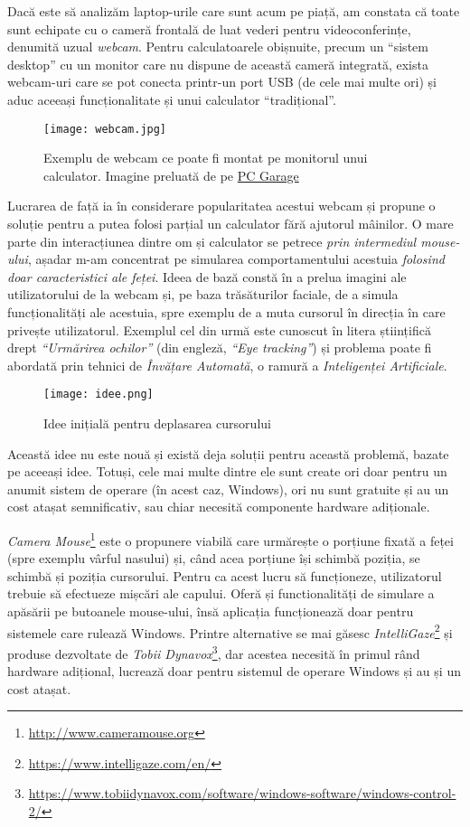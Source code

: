 Dacă este să analizăm laptop-urile care sunt acum pe piață, am constata că toate sunt echipate cu o cameră frontală de luat vederi pentru videoconferințe, denumită uzual \emph{webcam}.
Pentru calculatoarele obișnuite, precum un ``sistem desktop'' cu un monitor care nu dispune de această cameră integrată, exista webcam-uri care se pot conecta printr-un port USB (de cele mai multe ori) și aduc aceeași funcționalitate și unui calculator ``tradițional''.

\begin{figure}[h]
    \centering
    \texttt{[image: webcam.jpg]}
    \caption{Exemplu de webcam ce poate fi montat pe monitorul unui calculator. Imagine preluată de pe \href{https://www.pcgarage.ro/camere-web/logitech/streamcam-off-white/}{PC Garage}}
\end{figure}

Lucrarea de față ia în considerare popularitatea acestui webcam și propune o soluție pentru a putea folosi parțial un calculator fără ajutorul mâinilor.
O mare parte din interacțiunea dintre om și calculator se petrece \emph{prin intermediul mouse-ului}, așadar m-am concentrat pe simularea comportamentului acestuia \emph{folosind doar caracteristici ale feței}.
Ideea de bază constă în a prelua imagini ale utilizatorului de la webcam și, pe baza trăsăturilor faciale, de a simula funcționalități ale acestuia, spre exemplu de a muta cursorul în direcția în care privește utilizatorul.
Exemplul cel din urmă este cunoscut în litera științifică drept \emph{``Urmărirea ochilor''} (din engleză, \emph{``Eye tracking''}) și problema poate fi abordată prin tehnici de \emph{Învățare Automată}, o ramură a \emph{Inteligenței Artificiale}.

\begin{figure}[h]
    \centering
    \texttt{[image: idee.png]}
    \caption{Idee inițială pentru deplasarea cursorului}
\end{figure}

Această idee nu este nouă și există deja soluții pentru această problemă, bazate pe aceeași idee.
Totuși, cele mai multe dintre ele sunt create ori doar pentru un anumit sistem de operare (în acest caz, Windows), ori nu sunt gratuite și au un cost atașat semnificativ, sau chiar necesită componente hardware adiționale.

\emph{Camera Mouse}\footnote{\url{http://www.cameramouse.org}} este o propunere viabilă care urmărește o porțiune fixată a feței (spre exemplu vârful nasului) și, când acea porțiune își schimbă poziția, se schimbă și poziția cursorului.
Pentru ca acest lucru să funcționeze, utilizatorul trebuie să efectueze mișcări ale capului.
Oferă și functionalități de simulare a apăsării pe butoanele mouse-ului, însă aplicația funcționează doar pentru sistemele care rulează Windows.
Printre alternative se mai găsesc \emph{IntelliGaze}\footnote{\url{https://www.intelligaze.com/en/}} și produse dezvoltate de \emph{Tobii Dynavox}\footnote{\url{https://www.tobiidynavox.com/software/windows-software/windows-control-2/}}, dar acestea necesită în primul rând hardware adițional, lucrează doar pentru sistemul de operare Windows și au și un cost atașat.

